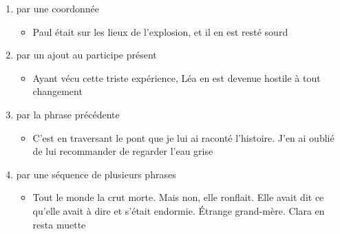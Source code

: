 \documentclass[UTF8]{report}
\begin{document}
\begin{enumerate}
    \item par une coordonnée
    \begin{itemize}
        \item Paul était sur les lieux de l’explosion, et il en est resté sourd
    \end{itemize}
    \item par un ajout au participe présent
    \begin{itemize}
        \item Ayant vécu cette triste expérience, Léa en est devenue hostile à tout changement
    \end{itemize}
    \item par la phrase précédente
    \begin{itemize}
        \item C’est en traversant le pont que je lui ai raconté l’histoire. J’en ai oublié de lui recommander de regarder l’eau grise
    \end{itemize}
    \item par une séquence de plusieurs phrases
    \begin{itemize}
        \item Tout le monde la crut morte. Mais non, elle ronflait. Elle avait dit ce qu’elle avait à dire et s’était endormie. Étrange grand-mère. Clara en resta muette
    \end{itemize}
\end{enumerate}
\end{document}

